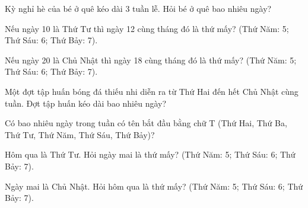 \begin{ex}
Kỳ nghỉ hè của bé ở quê kéo dài 3 tuần lễ. Hỏi bé ở quê bao nhiêu ngày?
\end{ex}

\begin{ex}
Nếu ngày 10 là Thứ Tư thì ngày 12 cùng tháng đó là thứ mấy? (Thứ Năm: 5; Thứ Sáu: 6; Thứ Bảy: 7).
\end{ex}

\begin{ex}
Nếu ngày 20 là Chủ Nhật thì ngày 18 cùng tháng đó là thứ mấy? (Thứ Năm: 5; Thứ Sáu: 6; Thứ Bảy: 7).
\end{ex}

\begin{ex}
Một đợt tập huấn bóng đá thiếu nhi diễn ra từ Thứ Hai đến hết Chủ Nhật cùng tuần. Đợt tập huấn kéo dài bao nhiêu ngày?
\end{ex}

\begin{ex}
Có bao nhiêu ngày trong tuần có tên bắt đầu bằng chữ T (Thứ Hai, Thứ Ba, Thứ Tư, Thứ Năm, Thứ Sáu, Thứ Bảy)?
\end{ex}

\begin{ex}
Hôm qua là Thứ Tư. Hỏi ngày mai là thứ mấy? (Thứ Năm: 5; Thứ Sáu: 6; Thứ Bảy: 7).
\end{ex}

\begin{ex}
Ngày mai là Chủ Nhật. Hỏi hôm qua là thứ mấy? (Thứ Năm: 5; Thứ Sáu: 6; Thứ Bảy: 7).
\end{ex}
